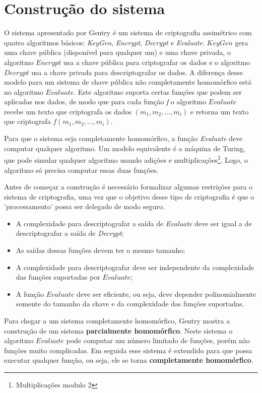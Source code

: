 \section{Construção do sistema}
\label{construcao}
O sistema apresentado por Gentry é um sistema de criptografia assimétrico com quatro algoritmos básicos: \textit{KeyGen}, \textit{Encrypt}, \textit{Decrypt} e \textit{Evaluate}. $KeyGen$ gera uma chave pública (disponível para qualquer um) e uma chave privada, o algoritmo $Encrypt$ usa a chave pública para criptografar os dados e o algoritmo $Decrypt$ usa a chave privada para descriptografar os dados. A diferença desse modelo para um sistema de chave pública não completamente homomórfico está no algoritmo $Evaluate$. Este algoritmo suporta certas funções que podem ser aplicadas nos dados, de modo que para cada função \textit{f} o algoritmo $Evaluate$ recebe um texto que criptografa os dados $(m_1, m_2, ..., m_i)$ e retorna um texto que criptografa $f(m_1, m_2, ..., m_i)$.

Para que o sistema seja completamente homomórfico, a função \textit{Evaluate} deve computar qualquer algoritmo. Um modelo equivalente é a máquina de Turing, que pode simular qualquer algoritmo usando adições e multiplicações\footnote{Multiplicações modulo 2}. Logo, o algoritmo só precisa computar essas duas funções.

Antes de começar a construção é necessário formalizar algumas restrições para o sistema de criptografia, uma vez que o objetivo desse tipo de criptografia é que o 'processamento' possa ser delegado de modo seguro.
\begin{itemize}
	\item A complexidade para descriptografar a saída de \textit{Evaluate} deve ser igual a de descriptografar a saída de \textit{Decrypt};
	\item As saídas dessas funções devem ter o mesmo tamanho;
	\item A complexidade para descriptografar deve ser independente da complexidade das funções suportadas por $Evaluate$;
	\item A função $Evaluate$ deve ser eficiente, ou seja, deve depender polinomialmente somente do tamanho da chave e da complexidade das funções suportadas.
\end{itemize}

Para chegar a um sistema completamente homomórfico, Gentry mostra a construção de um sistema \textbf{parcialmente homomórfico}. Neste sistema o algoritmo $Evaluate$ pode computar um número limitado de funções, porém não funções muito complicadas. Em seguida esse sistema é extendido para que possa executar qualquer função, ou seja, ele se torna \textbf{completamente homomórfico}.

